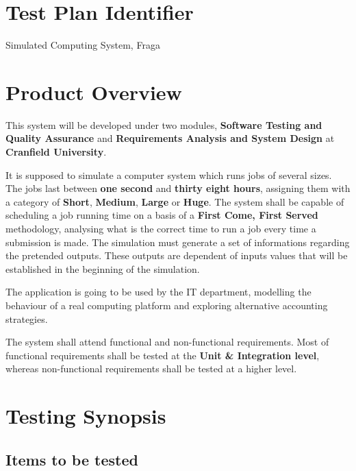 \documentclass[12pt]{article}
\begin{document}
\section*{Test Plan Identifier}

Simulated Computing System, Fraga


\section*{Product Overview}
\par This system will be developed under two modules, \textbf{Software Testing and Quality Assurance} and  \textbf{Requirements Analysis and System Design} at \textbf{Cranfield University}. 
\par It is supposed to simulate a computer system which runs jobs of several sizes. The jobs last between \textbf{one second} and \textbf{thirty eight hours}, assigning them with a category of \textbf{Short}, \textbf{Medium}, \textbf{Large} or \textbf{Huge}. The system shall be capable of scheduling a job running time on a basis of a \textbf{First Come, First Served} methodology, analysing what is the correct time to run a job every time a submission is made. The simulation must generate a set of informations regarding the pretended outputs. These outputs are dependent of inputs values that will be established in the beginning of the simulation.


\par The application is going to be used by the IT department, modelling the behaviour of a real computing platform and exploring alternative accounting strategies.

\par The system shall attend functional and non-functional requirements. Most of functional requirements shall be tested at the \textbf{Unit \& Integration level}, whereas non-functional requirements shall be tested at a higher level.

\section*{Testing Synopsis}

\subsection*{Items to be tested}
\end{document}

